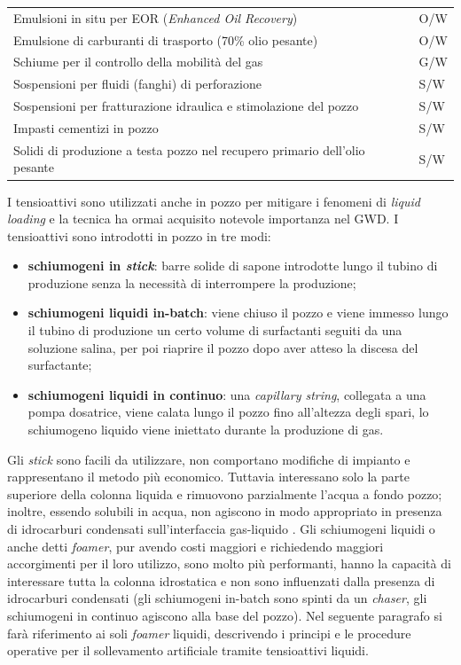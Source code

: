 \begin{table}[htbp]
\begin{tabular}{p{}p{}}
Emulsioni in situ per EOR (\textit{Enhanced Oil Recovery})                  & O/W                    \\
Emulsione di carburanti di trasporto (70\% olio pesante)                   & O/W                    \\
Schiume per il controllo della mobilità del gas                            & G/W                    \\
Sospensioni per fluidi (fanghi) di perforazione                            & S/W                    \\
Sospensioni per fratturazione idraulica e stimolazione del pozzo           & S/W                    \\
Impasti cementizi in pozzo                                                 & S/W                    \\
Solidi di produzione a testa pozzo nel recupero primario dell'olio pesante & S/W                    \\ \hline
\end{tabular}
\end{table}
I tensioattivi sono utilizzati anche in pozzo per mitigare i fenomeni di \textit{liquid loading} e la tecnica ha ormai acquisito notevole importanza nel GWD. I tensioattivi sono introdotti in pozzo in tre modi:
\begin{itemize}
    \item \textbf{schiumogeni in \textit{stick}}: barre solide di sapone introdotte lungo il tubino di produzione senza la necessità di interrompere la produzione;
    \item \textbf{schiumogeni liquidi in-batch}: viene chiuso il pozzo e viene immesso lungo il tubino di produzione un certo volume di surfactanti seguiti da una soluzione salina, per poi riaprire il pozzo dopo aver atteso la discesa del surfactante;
    \item \textbf{schiumogeni liquidi in continuo}: una \textit{capillary string}, collegata a una pompa dosatrice, viene calata lungo il pozzo fino all'altezza degli spari, lo schiumogeno liquido viene iniettato durante la produzione di gas.
\end{itemize}
 Gli \textit{stick} sono facili da utilizzare, non comportano modifiche di impianto e rappresentano il metodo più economico. Tuttavia interessano solo la parte superiore della colonna liquida e rimuovono parzialmente l'acqua a fondo pozzo; inoltre, essendo solubili in acqua, non agiscono in modo appropriato in presenza di idrocarburi condensati sull'interfaccia gas-liquido \parencite{bolding2007resurrecting}. Gli schiumogeni liquidi o anche detti \textit{foamer}, pur avendo costi maggiori e richiedendo maggiori accorgimenti per il loro utilizzo, sono molto più performanti, hanno la capacità di interessare tutta la colonna idrostatica e non sono influenzati dalla presenza di idrocarburi condensati (gli schiumogeni in-batch sono spinti da un \textit{chaser}, gli schiumogeni in continuo agiscono alla base del pozzo). Nel seguente paragrafo si farà riferimento ai soli \textit{foamer} liquidi, descrivendo i principi e le procedure operative per il sollevamento artificiale tramite tensioattivi liquidi.
 
